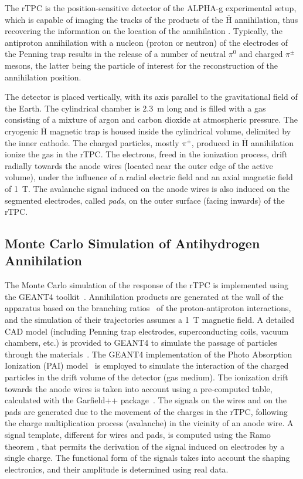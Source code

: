 \documentclass[a4paper,11pt]{article}
\begin{document}
The rTPC is the position-sensitive detector of the ALPHA-g experimental setup, which is capable of imaging the tracks of the products of the $\overline{\mathrm{H}}$ annihilation, thus recovering the information on the location of the annihilation \cite{capra2017design}. Typically, the antiproton annihilation with a nucleon (proton or neutron) of the electrodes of the Penning trap results in the release of a number of neutral $\pi^{0}$ and charged $\pi^{\pm}$ mesons, the latter being the particle of interest for the reconstruction of the annihilation position.

The detector is placed vertically, with its axis parallel to the gravitational field of the Earth. The cylindrical chamber is 2.3~m long and is filled with a gas consisting of a mixture of argon and carbon dioxide at atmospheric pressure. The cryogenic $\overline{\mathrm{H}}$ magnetic trap is housed inside the cylindrical volume, delimited by the inner cathode.
The charged particles, mostly $\pi^{\pm}$, produced in $\overline{\mathrm{H}}$ annihilation ionize the gas in the rTPC. The electrons, freed in the ionization process, drift radially towards the anode wires (located near the outer edge of the active volume), under the influence of a radial electric field and an axial magnetic field of 1~T. The avalanche signal induced on the anode wires is also induced on the segmented electrodes, called \textit{pads}, on the outer surface (facing inwards) of the rTPC.

\subsection{\label{subsec:MC}Monte Carlo Simulation of Antihydrogen Annihilation}
The Monte Carlo simulation of the response of the rTPC is implemented using the GEANT4 toolkit~\cite{AGOSTINELLI2003250,1610988,ALLISON2016186}. Annihilation products are generated at the wall of the apparatus based on the branching ratios~\cite{bendiscioli1994antinucleon} of the proton-antiproton interactions, and the simulation of their trajectories assumes a 1~T magnetic field. A detailed CAD model (including Penning trap electrodes, superconducting coils, vacuum chambers, etc.) is provided to GEANT4 to simulate the passage of particles through the materials~\cite{poole2012acad}. The GEANT4 implementation of the Photo Absorption Ionization (PAI) model~\cite{APOSTOLAKIS2000597} is employed to simulate the interaction of the charged particles in the drift volume of the detector (gas medium). The ionization drift towards the anode wires is taken into account using a pre-computed table, calculated with the Garfield++ package~\cite{schindlergarfield++}. The signals on the wires and on the pads are generated due to the movement of the charges in the rTPC, following the charge multiplication process (avalanche) in the vicinity of an anode wire. A signal template, different for wires and pads, is computed using the Ramo theorem \cite{sauli2015gaseous}, that permits the derivation of the signal induced on electrodes by a single charge. The functional form of the signals takes into account the shaping electronics, and their amplitude is determined using real data.
\end{document}
